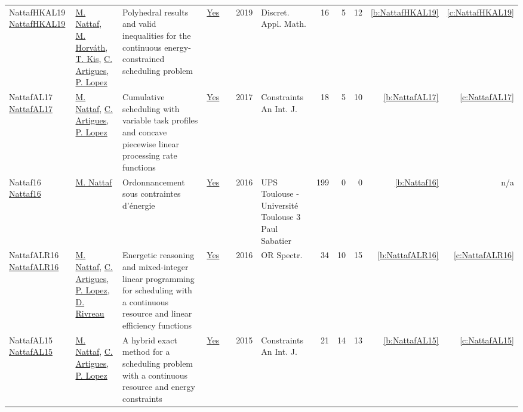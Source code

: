 {\begin{longtable}{>{\raggedright\arraybackslash}p{3cm}>{\raggedright\arraybackslash}p{6cm}>{\raggedright\arraybackslash}p{6.5cm}rrrp{2.5cm}rrrrr}
NattafHKAL19 \href{https://doi.org/10.1016/j.dam.2018.11.008}{NattafHKAL19} & \hyperref[auth:a81]{M. Nattaf}, \hyperref[auth:a1023]{M. Horv{\'{a}}th}, \hyperref[auth:a157]{T. Kis}, \hyperref[auth:a6]{C. Artigues}, \hyperref[auth:a3]{P. Lopez} & Polyhedral results and valid inequalities for the continuous energy-constrained scheduling problem & \href{works/NattafHKAL19.pdf}{Yes} & \cite{NattafHKAL19} & 2019 & Discret. Appl. Math. & 16 & 5 & 12 & \ref{b:NattafHKAL19} & \ref{c:NattafHKAL19}\\
NattafAL17 \href{https://doi.org/10.1007/s10601-017-9271-4}{NattafAL17} & \hyperref[auth:a81]{M. Nattaf}, \hyperref[auth:a6]{C. Artigues}, \hyperref[auth:a3]{P. Lopez} & Cumulative scheduling with variable task profiles and concave piecewise linear processing rate functions & \href{works/NattafAL17.pdf}{Yes} & \cite{NattafAL17} & 2017 & Constraints An Int. J. & 18 & 5 & 10 & \ref{b:NattafAL17} & \ref{c:NattafAL17}\\
Nattaf16 \href{https://laas.hal.science/tel-01417288}{Nattaf16} & \hyperref[auth:a81]{M. Nattaf} & {Ordonnancement sous contraintes d'{\'e}nergie} & \href{works/Nattaf16.pdf}{Yes} & \cite{Nattaf16} & 2016 & {UPS Toulouse - Universit{\'e} Toulouse 3 Paul Sabatier} & 199 & 0 & 0 & \ref{b:Nattaf16} & n/a\\
NattafALR16 \href{https://doi.org/10.1007/s00291-015-0423-x}{NattafALR16} & \hyperref[auth:a81]{M. Nattaf}, \hyperref[auth:a6]{C. Artigues}, \hyperref[auth:a3]{P. Lopez}, \hyperref[auth:a1003]{D. Rivreau} & Energetic reasoning and mixed-integer linear programming for scheduling with a continuous resource and linear efficiency functions & \href{works/NattafALR16.pdf}{Yes} & \cite{NattafALR16} & 2016 & {OR} Spectr. & 34 & 10 & 15 & \ref{b:NattafALR16} & \ref{c:NattafALR16}\\
NattafAL15 \href{https://doi.org/10.1007/s10601-015-9192-z}{NattafAL15} & \hyperref[auth:a81]{M. Nattaf}, \hyperref[auth:a6]{C. Artigues}, \hyperref[auth:a3]{P. Lopez} & A hybrid exact method for a scheduling problem with a continuous resource and energy constraints & \href{works/NattafAL15.pdf}{Yes} & \cite{NattafAL15} & 2015 & Constraints An Int. J. & 21 & 14 & 13 & \ref{b:NattafAL15} & \ref{c:NattafAL15}\\
\end{longtable}
}

